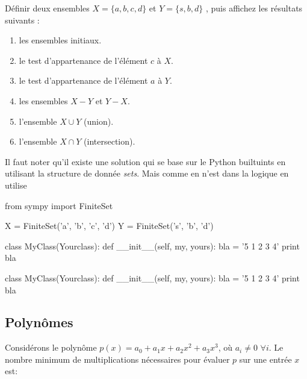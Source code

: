 \documentclass[11pt,fleqn]{book} %
\begin{document}
	\begin{exercise}
		Définir deux ensembles $X = \lbrace a, b, c, d\rbrace$ et  $Y = \lbrace s, b, d\rbrace$ , puis 			affichez les résultats suivants :
 		\begin{enumerate}
  			 \item les ensembles initiaux.
  			 \item le test d’appartenance de l’élément $c$ à $X$.
  			 \item le test d’appartenance de l’élément $a$ à $Y$.
  			 \item les ensembles $X - Y$ et $Y - X$.
  			 \item l’ensemble $X \cup Y$ (union).
  			 \item l'ensemble $X \cap Y$ (intersection).
	 \end{enumerate}
	\end{exercise}

\begin{solution}
Il faut noter qu'il existe une solution qui se base sur le Python builtuints en utilisant la structure de donnée \textit{sets}. Mais comme en n'est dans la logique en utilise 
\begin{python}
from sympy import FiniteSet

X = FiniteSet('a', 'b', 'c', 'd')
Y = FiniteSet('s', 'b', 'd')

class MyClass(Yourclass):
    def __init__(self, my, yours):
        bla = '5 1 2 3 4'
        print bla
\end{python}
\begin{python}
class MyClass(Yourclass):
    def __init__(self, my, yours):
        bla = '5 1 2 3 4'
        print bla
\end{python}

\end{solution}
\subsection{Polynômes}
\begin{exercise}
Considérons le polynôme $p(x) = a_{0} + a_{1} x + a_{2} x^{2} + a_{3} x^{3}$, où $a_{i} \neq 0$ $\forall i$. Le nombre minimum de multiplications nécessaires pour évaluer $p$ sur une entrée $x$ est:
\end{exercise}
\end{document}
